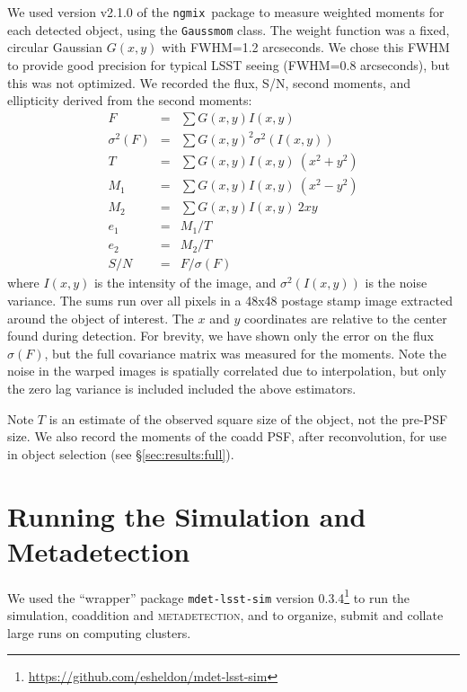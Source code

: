 \documentclass[twocolumn,twocolappendix,astrosym]{openjournal}
\newcommand{\ngmix}{\texttt{ngmix}}
\newcommand{\mdet}{\textsc{metadetection}}
\begin{document}
We used version v2.1.0 of the \ngmix\ package to measure weighted moments for
each detected object, using the \texttt{Gaussmom} class. The weight function
was a fixed, circular Gaussian $G(x, y)$ with FWHM=1.2 arcseconds. We chose
this FWHM to provide good precision for typical LSST seeing (FWHM=0.8
arcseconds), but this was not optimized.  We recorded the flux, S/N, second
moments, and ellipticity derived from the second moments:
\begin{eqnarray} \label{eq:moments}
    F &=& \sum G(x, y) I(x, y) \nonumber \\
    \sigma^2(F) &=& \sum G(x, y)^2 \sigma^2(I(x, y)) \nonumber \\
    T &=& \sum G(x, y) I(x, y) ~ (x^2 + y^2) \nonumber \\
    M_1 &=& \sum G(x, y) I(x, y) ~ (x^2 - y^2) \\
    M_2 &=& \sum G(x, y) I(x, y) ~ 2 x y \nonumber \\
    e_1 &=& M_1 / T \nonumber \\
    e_2 &=& M_2 / T \nonumber \\
    S/N &=& F / \sigma(F) \nonumber
\end{eqnarray}
where $I(x, y)$ is the intensity of the image, and $\sigma^2(I(x, y))$ is the
noise variance. The sums run over all pixels in a 48x48 postage stamp image
extracted around the object of interest.  The $x$ and $y$ coordinates are
relative to the center found during detection. For brevity, we have shown only
the error on the flux $\sigma(F)$, but the full covariance matrix was measured
for the moments.  Note the noise in the warped images is spatially correlated
due to interpolation, but only the zero lag variance is included included the
above estimators.

Note $T$ is an estimate of the observed square size of the object, not the
pre-PSF size.  We also record the moments of the coadd PSF, after
reconvolution, for use in object selection (see \S \ref{sec:results:full}).

\section{Running the Simulation and Metadetection} \label{sec:running}

We used the ``wrapper'' package \texttt{mdet-lsst-sim} version
0.3.4\footnote{\url{https://github.com/esheldon/mdet-lsst-sim}} to run the
simulation, coaddition and \mdet, and to organize, submit and collate large
runs on computing clusters.
\end{document}
